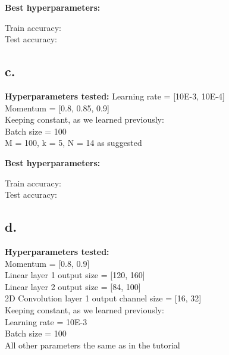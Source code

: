 \documentclass{article}
\newcommand{\1}{\mathbf{1}}
\begin{document}
{\textbf{Best hyperparameters:}

\begin{figure}[h]
  \centering
\end{figure}

Train accuracy: \\
Test accuracy: 

\subsection*{c.}

\textbf{Hyperparameters tested:}
Learning rate = [10E-3, 10E-4] \\
Momentum = [0.8, 0.85, 0.9] \\
Keeping constant, as we learned previously: \\
Batch size = 100 \\
M = 100, k = 5, N = 14 as suggested \\


\begin{figure}[h]
  \centering
\end{figure}

\textbf{Best hyperparameters:}

\begin{figure}[h]
  \centering
\end{figure}

Train accuracy: \\
Test accuracy: 

\subsection*{d.}

\textbf{Hyperparameters tested:} \\
Momentum = [0.8, 0.9] \\
Linear layer 1 output size = [120, 160] \\ 
Linear layer 2 output size = [84, 100] \\
2D Convolution layer 1 output channel size = [16, 32] \\
Keeping constant, as we learned previously: \\
Learning rate = 10E-3 \\
Batch size = 100 \\
All other parameters the same as in the tutorial 



}
\end{document}
